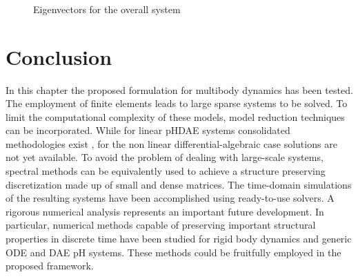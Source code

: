 \begin{figure*}[p]
	\centering
	\hfil
	 \\
	\hfil
	 \\
	\hfil
	 \\
	\caption{Eigenvectors for the overall system}
	\label{fig:om_setup}
\end{figure*}


\begin{comment}
Omega full lambda 1: 10.05488286658613
Omega full lambda 2: 32.820440166701395
Omega full lambda 3: 34.841016638952
Omega full lambda 4: 47.23797002941684
Omega full lambda 5: 63.78852519981024
Omega full lambda 6: 117.80124510761422
\end{comment}

\section{Conclusion}


In this chapter the proposed formulation for multibody dynamics has been tested. The employment of finite elements leads to large sparse systems to be solved. To limit the computational complexity of these models, model reduction techniques can be incorporated. While for linear pHDAE systems consolidated methodologies exist \cite{egger2018}, for the  non linear differential-algebraic case solutions are not yet available. To avoid the problem of dealing with large-scale systems, spectral methods can be equivalently used to achieve a structure preserving discretization made up of small and dense matrices. 
The time-domain simulations of the resulting systems have been accomplished using ready-to-use solvers. A rigorous numerical analysis represents an important future development. In particular, numerical methods capable of preserving important structural properties in discrete time have been studied for rigid body dynamics \cite{celledoni2018passivity} and generic ODE \cite{kotyczka2019discrete} and DAE \cite{mehrmann2019structurepreserving} pH systems. These methods could be fruitfully employed in the proposed framework. 